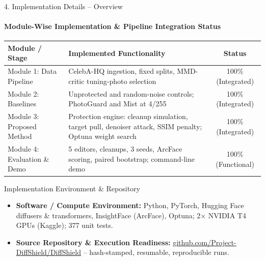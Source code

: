 \documentclass[aspectratio=169, 11pt]{beamer}
\begin{document}
\begin{frame}{4. Implementation Details -- Overview}
    \framesubtitle{Module-Wise Implementation \& Pipeline Integration Status}
    \begin{table}
        \centering
        \scriptsize
        \renewcommand{\arraystretch}{1.25}
        \begin{tabular}{L{3.3cm} L{7.6cm} c}
            \toprule
            \textbf{Module / Stage} & \textbf{Implemented Functionality} & \textbf{Status} \\
            \midrule
            Module 1: Data Pipeline & CelebA-HQ ingestion, fixed splits, MMD-critic tuning-photo selection & 100\% (Integrated) \\
            Module 2: Baselines & Unprotected and random-noise controls; PhotoGuard and Mist at 4/255 & 100\% (Integrated) \\
            Module 3: Proposed Method & Protection engine: cleanup simulation, target pull, denoiser attack, SSIM penalty; Optuna weight search & 100\% (Integrated) \\
            Module 4: Evaluation \& Demo & 5 editors, cleanups, 3 seeds, ArcFace scoring, paired bootstrap; command-line demo & 100\% (Functional) \\
            \bottomrule
        \end{tabular}
    \end{table}

    \begin{block}{Implementation Environment \& Repository}
        \scriptsize
        \begin{itemize}
            \item \textbf{Software / Compute Environment:} Python, PyTorch, Hugging Face diffusers \& transformers, InsightFace (ArcFace), Optuna; 2$\times$ NVIDIA T4 GPUs (Kaggle); 377 unit tests.
            \item \textbf{Source Repository \& Execution Readiness:} \href{https://github.com/Project-DiffShield/DiffShield}{\textcolor{amritaMaroon}{\underline{github.com/Project-DiffShield/DiffShield}}} -- hash-stamped, resumable, reproducible runs.
        \end{itemize}
    \end{block}
\end{frame}
\end{document}
